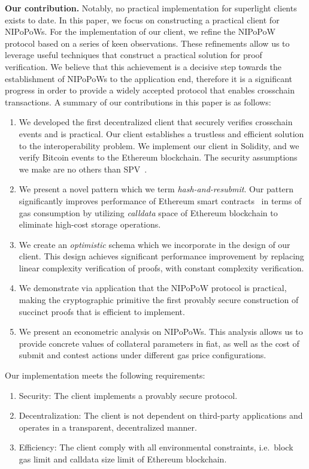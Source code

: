 \noindent

\textbf{Our contribution.} Notably, no practical implementation for superlight
clients exists to date. In this paper, we focus on constructing a practical
client for NIPoPoWs. For the implementation of our client, we refine the
NIPoPoW protocol based on a series of keen observations. These refinements
allow us to leverage useful techniques that construct a practical solution for
proof verification. We believe that this achievement is a decisive step towards
the establishment of NIPoPoWs to the application end, therefore it is a
significant progress in order to provide a widely accepted protocol that
enables crosschain transactions. A summary of our contributions in this paper
is as follows:
\begin{enumerate}
\item We developed the first decentralized client that securely verifies
crosschain events and is practical. Our client establishes a trustless and
efficient solution to the interoperability problem. We implement our client
in Solidity, and we verify Bitcoin events to the Ethereum blockchain. The
security assumptions we make are no others than
SPV~\cite{eclipse, eclipse-ethereum}.
\item We present a novel pattern which we term \emph{hash-and-resubmit}. Our
pattern significantly improves performance of Ethereum smart
contracts~\cite{wood, buterin} in terms of gas consumption by utilizing
\emph{calldata} space of Ethereum blockchain to eliminate high-cost storage
operations.
\item We create an \emph{optimistic} schema which we incorporate in the design
of our client. This design achieves significant performance improvement by
replacing linear complexity verification of proofs, with constant complexity
verification.
\item We demonstrate via application that the NIPoPoW protocol is practical,
making the cryptographic primitive the first provably secure construction of
succinct proofs that is efficient to implement.
\item We present an econometric analysis on NIPoPoWs. This analysis allows us
to provide concrete values of collateral parameters in fiat, as well as the
cost of submit and contest actions under different gas price configurations.

\end{enumerate}

Our implementation meets the following requirements:
\begin{enumerate}
\item Security: The client implements a provably secure protocol.
\item Decentralization: The client is not dependent on third-party applications
and operates in a transparent, decentralized manner.
\item Efficiency: The client comply with all environmental constraints, i.e.\
block gas limit and calldata size limit of Ethereum blockchain.
\end{enumerate}

